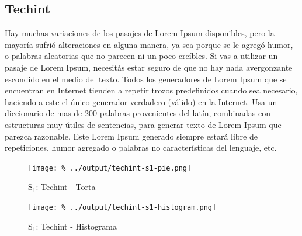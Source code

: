 \documentclass[final,narroweqnarray,inline]{ieee}
\begin{document}
  \subsection{Techint}

Hay muchas variaciones de los pasajes de Lorem Ipsum disponibles, pero la mayoría sufrió alteraciones en alguna manera, ya sea porque se le agregó humor, o palabras aleatorias que no parecen ni un poco creíbles. Si vas a utilizar un pasaje de Lorem Ipsum, necesitás estar seguro de que no hay nada avergonzante escondido en el medio del texto. Todos los generadores de Lorem Ipsum que se encuentran en Internet tienden a repetir trozos predefinidos cuando sea necesario, haciendo a este el único generador verdadero (válido) en la Internet. Usa un diccionario de mas de 200 palabras provenientes del latín, combinadas con estructuras muy útiles de sentencias, para generar texto de Lorem Ipsum que parezca razonable. Este Lorem Ipsum generado siempre estará libre de repeticiones, humor agregado o palabras no características del lenguaje, etc.

    \begin{figure}[ht]\begin{center}
      \texttt{[image: \%
      ../output/techint-s1-pie.png]}
      \vspace{-2em}
      \caption{S$_1$: Techint - Torta}
      \label{techint-s1-pie}
    \end{center}\end{figure}

    \begin{figure}[ht]\begin{center}
      \texttt{[image: \%
      ../output/techint-s1-histogram.png]}
      \vspace{-2em}
      \caption{S$_1$: Techint - Histograma}
      \label{techint-s1-histogram}
    \end{center}\end{figure}


\end{document}
